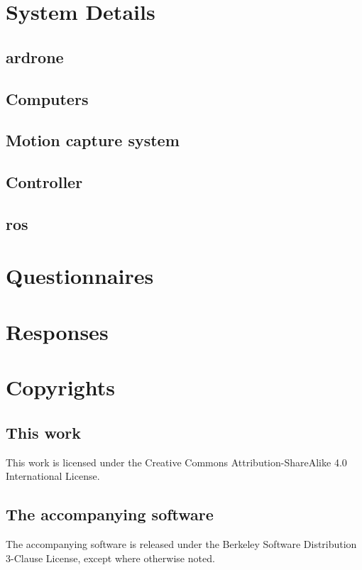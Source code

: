 \appendix
\chapter{System Details}
\section{\gls{ardrone}}
\section{Computers}  %
\section{Motion capture system}
\section{Controller}
\section{\gls{ros}}  %

\chapter{Questionnaires}

\chapter{Responses}

\chapter{Copyrights}
\section{This work}
This work is licensed under the Creative Commons Attribution-ShareAlike 4.0 International License.
\section{The accompanying software}
The accompanying software is released under the Berkeley Software Distribution 3-Clause License, except where otherwise noted. 
